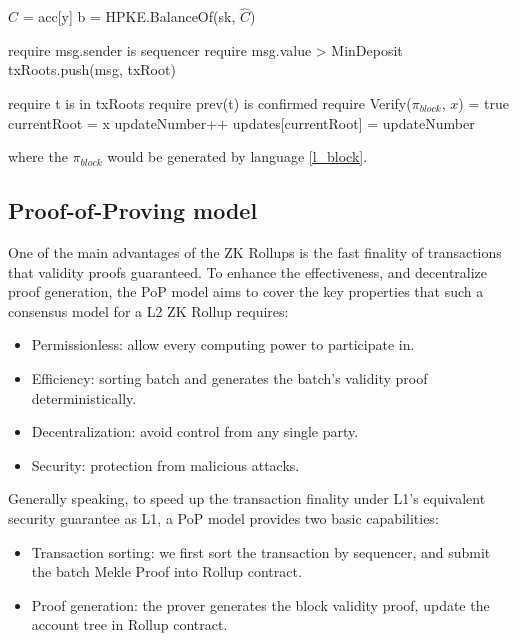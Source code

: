 \documentclass{article}
\begin{document}
\begin{algorithm}
\begin{multicols}{2}
   {
    $\hat{C}$ = acc[y] \;
    b = HPKE.BalanceOf(sk, $\hat{C}$) \;
  }
  
   {
     require msg.sender is sequencer \;
     require msg.value > MinDeposit \;
     txRoots.push({msg, txRoot}) \;
  }
  
   {
    
    require t is in txRoots \;
    require prev(t) is confirmed \;
    require Verify($\pi_{block}$, $x$) = true \;
    currentRoot = x \;
    updateNumber++ \;
    updates[currentRoot] = updateNumber \;
  }
\end{multicols}

\end{algorithm}
where the $\pi_{block}$ would be generated by language \ref{l_block}.



\subsection{Proof-of-Proving model}

One of the main advantages of the ZK Rollups is the fast finality of transactions that validity proofs guaranteed. To enhance the effectiveness, and decentralize proof generation, the PoP model aims to cover the key properties that such a consensus model for a L2 ZK Rollup requires:
\begin{itemize}
    \item Permissionless: allow every computing power to participate in.
    \item Efficiency: sorting batch and generates the batch's validity proof deterministically.
    \item Decentralization: avoid control from any single party.
    \item Security: protection from malicious attacks.
\end{itemize}

Generally speaking, to speed up the transaction finality under L1's equivalent security guarantee as L1, a PoP model provides two basic capabilities:

\begin{itemize}
    \item Transaction sorting: we first sort the transaction by sequencer, and submit the batch Mekle Proof into Rollup contract.
    \item Proof generation: the prover generates the block validity proof, update the account tree in Rollup contract.
\end{itemize}
\end{document}
